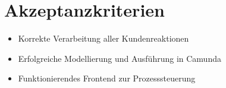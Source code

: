 \documentclass[12pt,a4paper]{article}
\begin{document}
\section{Akzeptanzkriterien}
\begin{itemize}
    \item Korrekte Verarbeitung aller Kundenreaktionen
    \item Erfolgreiche Modellierung und Ausführung in Camunda
    \item Funktionierendes Frontend zur Prozesssteuerung
\end{itemize}

\end{document}

